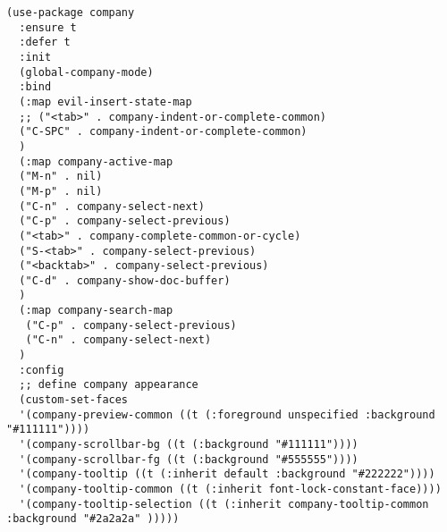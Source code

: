 \documentclass[11pt]{article}
\begin{document}
\begin{verbatim}
(use-package company
  :ensure t
  :defer t
  :init
  (global-company-mode)
  :bind
  (:map evil-insert-state-map
  ;; ("<tab>" . company-indent-or-complete-common)
  ("C-SPC" . company-indent-or-complete-common)
  )
  (:map company-active-map
  ("M-n" . nil)
  ("M-p" . nil)
  ("C-n" . company-select-next)
  ("C-p" . company-select-previous)
  ("<tab>" . company-complete-common-or-cycle)
  ("S-<tab>" . company-select-previous)
  ("<backtab>" . company-select-previous)
  ("C-d" . company-show-doc-buffer)
  )
  (:map company-search-map
   ("C-p" . company-select-previous)
   ("C-n" . company-select-next)
  )
  :config
  ;; define company appearance
  (custom-set-faces
  '(company-preview-common ((t (:foreground unspecified :background "#111111"))))
  '(company-scrollbar-bg ((t (:background "#111111"))))
  '(company-scrollbar-fg ((t (:background "#555555"))))
  '(company-tooltip ((t (:inherit default :background "#222222"))))
  '(company-tooltip-common ((t (:inherit font-lock-constant-face))))
  '(company-tooltip-selection ((t (:inherit company-tooltip-common :background "#2a2a2a" )))))


\end{verbatim}
\end{document}
